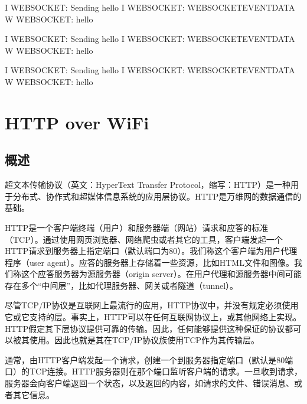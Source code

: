 \documentclass[a4paper,12pt,english]{sphinxmanual}
\begin{document}
{{\begin{sphinxVerbatim}[commandchars=\\\{\}]
I  WEBSOCKET: Sending hello 
I  WEBSOCKET: WEBSOCKET\PYGZus{}EVENT\PYGZus{}DATA
W  WEBSOCKET: hello 

I  WEBSOCKET: Sending hello 
I  WEBSOCKET: WEBSOCKET\PYGZus{}EVENT\PYGZus{}DATA
W  WEBSOCKET: hello 

I  WEBSOCKET: Sending hello 
I  WEBSOCKET: WEBSOCKET\PYGZus{}EVENT\PYGZus{}DATA
W  WEBSOCKET: hello 
\end{sphinxVerbatim}

\sphinxstepscope


\section{HTTP over WiFi}
\label{\detokenize{exp-esp32/http:http-over-wifi}}\label{\detokenize{exp-esp32/http::doc}}

\subsection{概述}
\label{\detokenize{exp-esp32/http:id1}}
\sphinxAtStartPar
超文本传输协议（英文：HyperText Transfer Protocol，缩写：HTTP）是一种用于分布式、协作式和超媒体信息系统的应用层协议。HTTP是万维网的数据通信的基础。

\sphinxAtStartPar
HTTP是一个客户端终端（用户）和服务器端（网站）请求和应答的标准（TCP）。通过使用网页浏览器、网络爬虫或者其它的工具，客户端发起一个HTTP请求到服务器上指定端口（默认端口为80）。我们称这个客户端为用户代理程序（user agent）。应答的服务器上存储着一些资源，比如HTML文件和图像。我们称这个应答服务器为源服务器（origin server）。在用户代理和源服务器中间可能存在多个“中间层”，比如代理服务器、网关或者隧道（tunnel）。

\sphinxAtStartPar
尽管TCP/IP协议是互联网上最流行的应用，HTTP协议中，并没有规定必须使用它或它支持的层。事实上，HTTP可以在任何互联网协议上，或其他网络上实现。HTTP假定其下层协议提供可靠的传输。因此，任何能够提供这种保证的协议都可以被其使用。因此也就是其在TCP/IP协议族使用TCP作为其传输层。

\sphinxAtStartPar
通常，由HTTP客户端发起一个请求，创建一个到服务器指定端口（默认是80端口）的TCP连接。HTTP服务器则在那个端口监听客户端的请求。一旦收到请求，服务器会向客户端返回一个状态，以及返回的内容，如请求的文件、错误消息、或者其它信息。

}}
\end{document}
